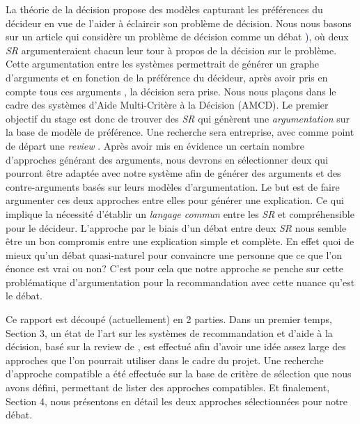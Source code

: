 \documentclass[a4paper, 11pt]{article}
\begin{document}
La théorie de la décision propose des modèles capturant les préférences du décideur en vue de l’aider à éclaircir son problème de décision. Nous nous basons sur un article qui considère un problème de décision comme un débat \textcolor{blue}{\citep{DBLP})}, où deux \textit{SR} argumenteraient chacun leur tour à propos de la décision sur le problème. Cette argumentation entre les systèmes permettrait de générer un graphe d'arguments et en fonction de la préférence du décideur, après avoir pris en compte tous ces arguments \textcolor{blue}{\citep{DUNG1995321}}, la décision sera prise. Nous nous plaçons dans le cadre des systèmes d'Aide Multi-Critère à la Décision  (AMCD). 
Le premier objectif du stage est donc de trouver des \textit{SR} qui génèrent une \textit{argumentation} sur la base de modèle de préférence. Une recherche sera entreprise, avec comme point de départ une \textit{review} \textcolor{blue}{\citep{NunesJannachUmuai2017}}. Après avoir mis en évidence un certain nombre d'approches générant des arguments, nous devrons en sélectionner deux qui pourront être adaptée avec notre système afin de générer des arguments et des contre-arguments basés sur leurs modèles d'argumentation. Le but est de faire argumenter ces deux approches entre elles pour générer une explication. Ce qui implique la nécessité d'établir un \textit{langage commun} entre les \textit{SR} et compréhensible pour le décideur.
L'approche par le biais d'un débat entre deux \textit{SR} nous semble être un bon compromis entre une explication simple et complète. En effet quoi de mieux qu'un débat quasi-naturel pour convaincre une personne que ce que l'on énonce est vrai ou non? C'est pour cela que notre approche se penche sur cette problématique d'argumentation pour la recommandation avec cette nuance qu'est le débat.

\begin{comment}
On se palce dans le cadre MCDA
plusieurs travaux dessus
on s'interresse sur les systeme de recommendation
plus précisément ceux fournissant une argumentation.
on se place dans ce cadre mais avec l'approche d'un débat
le but du stage est donc de mettre en application, projet deux systeme qui feront un débat entre eux; en utilisant des argument et contre argument;
LE but : comment conceptualisé les approche dans le débat, langage commun  et programmer ce sujet; 
\end{comment}


Ce rapport est découpé (actuellement) en 2 parties. Dans un premier temps, 
Section 3, un état de l'art sur les systèmes de recommandation et d'aide à la décision, basé sur la review de \textcolor{blue}{\citep{NunesJannachUmuai2017}}
, est effectué afin d'avoir une idée assez large des approches que l'on pourrait utiliser dans le cadre du projet. Une recherche d'approche compatible a été effectuée sur la base de critère de sélection que nous avons défini, permettant de lister des approches compatibles. Et finalement, Section 4, nous présentons en détail les deux approches sélectionnées pour notre débat.
\end{document}
